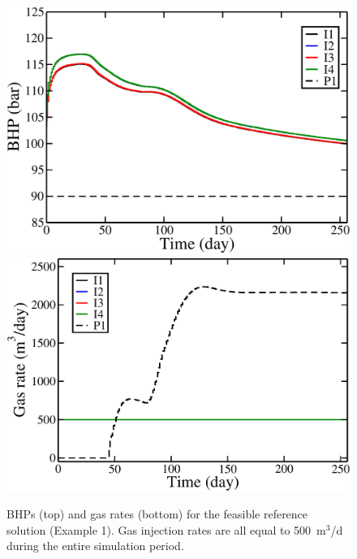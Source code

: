 \begin{figure}
\begin{center}
\includegraphics[totalheight=2.2in,angle=0]{figures/ReferenceC500HeuristicItPb_BHP.pdf}
\includegraphics[totalheight=2.17in,angle=0]{figures/ReferenceC500HeuristicItPb_rate_gas.pdf}
\end{center}
\caption{BHPs (top) and gas rates (bottom) for the feasible reference solution (Example 1). 
  Gas injection rates are all equal to 500~m$^3$/d during the entire simulation period. }
\label{fig:PIReferencePlots}
\end{figure}






